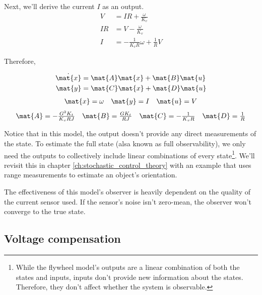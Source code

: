Next, we'll derive the current $I$ as an output.
\begin{align*}
  V &= IR + \frac{\omega}{K_v} \\
  IR &= V - \frac{\omega}{K_v} \\
  I &= -\frac{1}{K_v R} \omega + \frac{1}{R} V
\end{align*}

Therefore,
\begin{theorem}
  \begin{align*}
    \dot{\mat{x}} &= \mat{A} \mat{x} + \mat{B} \mat{u} \\
    \mat{y} &= \mat{C} \mat{x} + \mat{D} \mat{u}
  \end{align*}
  \begin{equation*}
    \begin{array}{ccc}
      \mat{x} = \omega &
      \mat{y} = I &
      \mat{u} = V
    \end{array}
  \end{equation*}
  \begin{equation}
    \begin{array}{cccc}
      \mat{A} = -\frac{G^2 K_t}{K_v RJ} &
      \mat{B} = \frac{G K_t}{RJ} &
      \mat{C} = -\frac{1}{K_v R} &
      \mat{D} = \frac{1}{R}
    \end{array}
  \end{equation}
\end{theorem}

Notice that in this \gls{model}, the \gls{output} doesn't provide any direct
measurements of the \gls{state}. To estimate the full \gls{state} (alsa known as
full observability), we only need the \glspl{output} to collectively include
linear combinations of every \gls{state}\footnote{While the flywheel model's
outputs are a linear combination of both the states and inputs, \glspl{input}
don't provide new information about the \glspl{state}. Therefore, they don't
affect whether the system is observable.}. We'll revisit this in chapter
\ref{ch:stochastic_control_theory} with an example that uses range measurements
to estimate an object's orientation.

The effectiveness of this \gls{model}'s \gls{observer} is heavily dependent on
the quality of the current sensor used. If the sensor's noise isn't zero-mean,
the \gls{observer} won't converge to the true \gls{state}.

\subsection{Voltage compensation}

